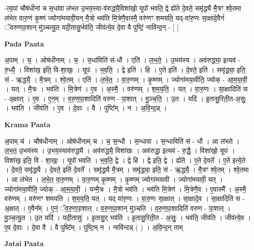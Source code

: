 \documentclass[17pt]{extarticle}
\begin{document}
-त्य॒पां चौष॑धीनां च स॒धांवा ल॑भत उ॒भय॒स्या-व॑रुद्ध्यै॒विशा॑खो॒ यूपो॑ भवति॒ द्वे ह्ये॑ते दे॒वते॒ समृ॑द्ध्यै मै॒त्रꣳ श्वे॒तमा ल॑भेत वारु॒णं कृ॒ष्णं ज्योगा॑मयावी॒यन् मै॒त्रो भव॑ति मि॒त्रेणै॒वास्मै॒ वरु॑णꣳ शमयति॒ यद्-वा॑रु॒णः सा॒क्षादे॒वैनं॑ ॅवरुणपा॒शान् मु॑ञ्चत्यु॒त यदी॒तासु॒र्भव॑ति॒ जीव॑त्ये॒व दे॒वा वै पुष्टिं॒ नावि॑न्द॒न् - [  ] \newline

\textbf{Pada Paata} \newline

अ॒पाम् । च॒ । ओष॑धीनाम् । च॒ । स॒धांविति॑ सं-धौ । एति॑ । ल॒भ॒ते॒ । उ॒भय॑स्य । अव॑रुद्ध्या॒ इत्यव॑ - रु॒ध्यै॒ । विशा॑ख॒ इति॒ वि-शा॒खः॒ । यूपः॑ । भ॒व॒ति॒ । द्वे इति॑ । हि । ए॒ते इति॑ । दे॒वते॒ इति॑ । समृ॑द्ध्या॒ इति॒ सं - ऋ॒द्ध्यै॒ । मै॒त्रम् । श्वे॒तम् । एति॑ । ल॒भे॒त॒ । वा॒रु॒णम् । कृ॒ष्णम् । ज्योगा॑मया॒वीति॒ ज्योक् - आ॒म॒या॒वी॒ । यत् । मै॒त्रः । भव॑ति । मि॒त्रेण॑ । ए॒व । अ॒स्मै॒ । वरु॑णम् । श॒म॒य॒ति॒ । यत् । वा॒रु॒णः । सा॒क्षादिति॑ स - अ॒क्षात् । ए॒व । ए॒न॒म् । व॒रु॒ण॒पा॒शादिति॑ वरुण - पा॒शात् । मु॒ञ्च॒ति॒ । उ॒त । यदि॑ । इ॒तासु॒रिती॒त-अ॒सुः॒ । भव॑ति । जीव॑ति । ए॒व । दे॒वाः । वै । पुष्टि᳚म् । न । अ॒वि॒न्द॒न्न् ।  \newline


\textbf{Krama Paata} \newline

अ॒पाम् च॑ । चौष॑धीनाम् । ओष॑धीनाम् च । च॒ स॒न्धौ । स॒न्धावा । स॒न्धाविति॑ सं - धौ । आ ल॑भते । ल॒भ॒त॒ उ॒भय॑स्य । उ॒भय॒स्याव॑रुद्ध्यै । अव॑रुद्ध्यै॒ विशा॑खः । अव॑रुद्धा॒ इत्यव॑ - रु॒द्धै॒ । विशा॑खो॒ यूपः॑ । विशा॑ख॒ इति॒ वि - शा॒खः॒ । यूपो॑ भवति । भ॒व॒ति॒ द्वे । द्वे हि । द्वे इति॒ द्वे । ह्ये॑ते । ए॒ते दे॒वते᳚ । ए॒ते इत्ये॒ते । दे॒वते॒ समृ॑द्ध्यै । दे॒वते॒ इति॑ दे॒वते᳚ । समृ॑द्ध्यै मै॒त्रम् । समृ॑द्ध्या॒ इति॒ सं - ऋ॒द्ध्यै॒ । मै॒त्रꣳ श्वे॒तम् । श्वे॒तमा । आ ल॑भेत । ल॒भे॒त॒ वा॒रु॒णम् । वा॒रु॒णम् कृ॒ष्णम् । कृ॒ष्णम् ज्योगा॑मयावी । ज्योगा॑मयावी॒ यत् । ज्योगा॑मया॒वीति॒ ज्योक् - आ॒म॒या॒वी॒ । यन्मै॒त्रः । मै॒त्रो भव॑ति । भव॑ति मि॒त्रेण॑ । मि॒त्रेणै॒व । ए॒वास्मै᳚ । अ॒स्मै॒ वरु॑णम् । वरु॑णꣳ शमयति । श॒म॒य॒ति॒ यत् । यद् वा॑रु॒णः । वा॒रु॒णः सा॒क्षात् । सा॒क्षादे॒व । सा॒क्षादिति॑ स - अ॒क्षात् । ए॒वैन᳚म् । ए॒नं॒ ॅव॒रु॒ण॒पा॒शात् । व॒रु॒ण॒पा॒शान् मु॑ञ्चति । व॒रु॒ण॒पा॒शादिति॑ वरुण - पा॒शात् । मु॒ञ्च॒त्यु॒त । उ॒त यदि॑ । यदी॒तासुः॑ । इ॒तासु॒र् भव॑ति । इ॒तासु॒रिती॒त - अ॒सुः॒ । भव॑ति॒ जीव॑ति । जीव॑त्ये॒व । ए॒व दे॒वाः । दे॒वा वै । वै पुष्टि᳚म् । पुष्टि॒म् न । नावि॑न्दन्न् ( ) । अ॒वि॒न्द॒न् ताम् \newline

\textbf{Jatai Paata} \newline
\end{document}

